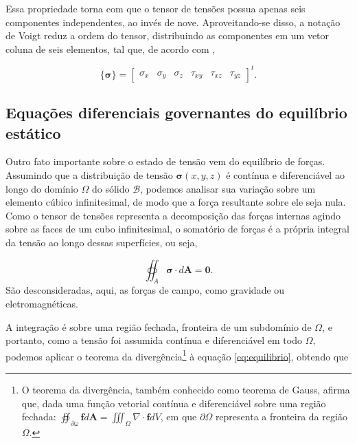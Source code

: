 Essa propriedade torna com que o tensor de tensões possua apenas seis componentes independentes, ao invés de nove. Aproveitando-se disso, a notação de Voigt reduz a ordem do tensor, distribuindo as componentes em um vetor coluna de seis elementos, tal que, de acordo com ,

\begin{equation}
    \{\bm{\sigma}\} = \begin{bmatrix}
        \sigma_x & \sigma_y & \sigma_z & \tau_{xy} & \tau_{xz} & \tau_{yz}
    \end{bmatrix}^t.
\end{equation}




\subsection{Equações diferenciais governantes do equilíbrio estático}

Outro fato importante sobre o estado de tensão vem do equilíbrio de forças. Assumindo que a distribuição de tensão $\bm{\sigma}(x,y,z)$ é contínua e diferenciável ao longo do domínio $\Omega$ do sólido $\mathcal{B}$, podemos analisar sua variação sobre um elemento cúbico infinitesimal, de modo que a força resultante sobre ele seja nula. Como o tensor de tensões representa a decomposição das forças internas agindo sobre as faces de um cubo infinitesimal, o somatório de forças é a própria integral da tensão ao longo dessas superfícies, ou seja,

\begin{equation}
    \oiint_A \bm{\sigma} \cdot d\bm{A} = \bm{0}.
    \label{eq:equilibrio}
\end{equation}
São desconsideradas, aqui, as forças de campo, como gravidade ou eletromagnéticas. \cite[pág. 4, The Equilibrium Equations]{roylance}

A integração é sobre uma região fechada, fronteira de um subdomínio de $\Omega$, e portanto, como a tensão foi assumida contínua e diferenciável em todo $\Omega$, podemos aplicar o teorema da divergência\footnote{O teorema da divergência, também conhecido como teorema de Gauss, afirma que, dada uma função vetorial contínua e diferenciável sobre uma região fechada: $ \oiint_{\partial \omega} \bm{f} d\bm{A} = \iiint_{\Omega} \nabla \cdot \bm{f} dV$, em que $\partial \Omega$ representa a fronteira da região $\Omega$.} à equação \ref{eq:equilibrio}, obtendo que

